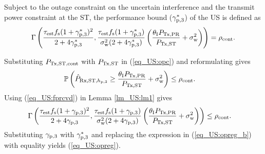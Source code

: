 \begin{coro} \label{cor_US:cor1}
\normalfont
Subject to the outage constraint on the uncertain interference and the transmit power constraint at the ST, the performance bound (${\gamma}_{\text{p,3}}^*$) of the US is defined as %
\begin{align}
\Gamma\left(\frac{\tau_{\text{est}} f_{\text{s}} (1 + {\gamma}_{\text{p,3}}^*)^2}{2 + 4 {\gamma}_{\text{p,3}}^*}, \frac{\tau_{\text{est}} f_{\text{s}} (1  + {\gamma}_{\text{p,3}}^*)}{\sigma^2_{\text{w}} (2 + 4 {\gamma}_{\text{p,3}}^*)} \left( \frac{\theta_{\text{I}} P_{\text{Tx,PR}}}{P_{\text{Tx,ST}}} + \sigma^2_{\text{w}}  \right)  \right) = \rho_{\text{cont}}. \label{eq_US:opreg}  
\end{align}
\end{coro}
\begin{IEEEproof}
Substituting $P_{\text{Tx,ST,cont}}$ with $P_{\text{Tx,ST}}$ in (\ref{eq_US:opc}) and reformulating gives 
\begin{align}
\mathbb P\left( \hat{P}_{\text{Rx,ST,$h_{\text{p,3}}$}} \ge \frac{\theta_{\text{I}} P_{\text{Tx,PR}}}{P_{\text{Tx,ST}}} + \sigma^2_{\text{w}} \right) &\le \rho_{\text{cont}}. \label{eq_US:opreg_a} 
\end{align}
Using (\ref{eq_US:fprcvd}) in Lemma \ref{lm_US:lm1} gives
\begin{align}
\Gamma\left(\frac{\tau_{\text{est}} f_{\text{s}} (1 + {\gamma}_{\text{p,3}})^2}{2 + 4 {\gamma}_{\text{p,3}}}, \frac{\tau_{\text{est}} f_{\text{s}} (1  + {\gamma}_{\text{p,3}})}{\sigma^2_{\text{w}} (2 + 4 {\gamma}_{\text{p,3}})} \left( \frac{\theta_{\text{I}} P_{\text{Tx,PR}}}{P_{\text{Tx,ST}}} + \sigma^2_{\text{w}}  \right)  \right) &\le \rho_{\text{cont}}. \label{eq_US:opreg_b} 
\end{align}
Substituting ${\gamma}_{\text{p,3}}$ with ${\gamma}_{\text{p,3}}^*$ and replacing the expression in (\ref{eq_US:opreg_b}) with equality yields (\ref{eq_US:opreg}). 
\end{IEEEproof}
